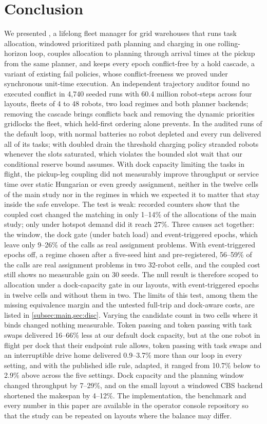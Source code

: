 \section{Conclusion}\label{sec:concl}

We presented \sname, a lifelong fleet manager for grid warehouses that runs
task allocation, windowed prioritized path planning and charging in one
rolling-horizon loop, couples allocation to planning through arrival times
at the pickup from the same planner, and keeps every epoch conflict-free by
a hold cascade, a variant of existing fail policies, whose conflict-freeness
we proved under synchronous unit-time execution. An independent trajectory auditor
found no executed conflict in 4{,}740 seeded runs with 60.4 million
robot-steps across four layouts, fleets of 4 to 48 robots, two load
regimes and both planner backends; removing the cascade brings conflicts
back and removing the dynamic priorities gridlocks the fleet, which held-first
ordering alone prevents. In the audited runs of the default loop, with normal
batteries no robot depleted and every run delivered all of its tasks; with
doubled drain the threshold charging policy stranded robots whenever the
slots saturated, which violates the bounded slot wait that our conditional
reserve bound assumes. With dock capacity limiting the tasks in flight, the
pickup-leg coupling did not measurably improve throughput or service time
over static Hungarian or even greedy assignment, neither in the twelve cells
of the main study nor in the regimes in which we expected it to matter that stay inside
the safe envelope. The test is weak: recorded counters show that the
coupled cost changed the matching in only 1--14\% of the allocations of the
main study; only under hotspot demand did it reach 27\%. Three causes act together:
the window, the dock gate (under batch load) and event-triggered epochs, which leave only 9--26\% of the calls
as real assignment problems. With event-triggered epochs off, a regime chosen after a
five-seed hint and pre-registered, 56--59\% of the calls are real assignment problems in two
32-robot cells, and the coupled cost still shows no measurable gain on 30 seeds. The null result is
therefore scoped to allocation under a dock-capacity gate in our layouts, with
event-triggered epochs in twelve cells and without them in two. The limits of this test, among them the missing equivalence margin and the
untested full-trip and dock-aware costs, are listed in \cref{subsec:main,sec:disc}.
Varying the candidate count in two cells where it binds changed nothing measurable.
Token passing and token passing with task swaps delivered 16--66\%
less at our default dock capacity, but at
the one robot in flight per dock that their endpoint rule allows, token
passing with task swaps and an interruptible drive home delivered 0.9--3.7\%
more than our loop in every setting, and with the published idle rule,
adapted, it ranged from 10.7\% below to 2.9\% above across the five settings.
Dock capacity and the planning window changed throughput
by 7--29\%, and on the small layout a windowed CBS backend shortened the makespan
by 4--12\%.
The implementation, the benchmark and every number in this paper are
available in the operator console repository so that the study can be
repeated on layouts where the balance may differ.
